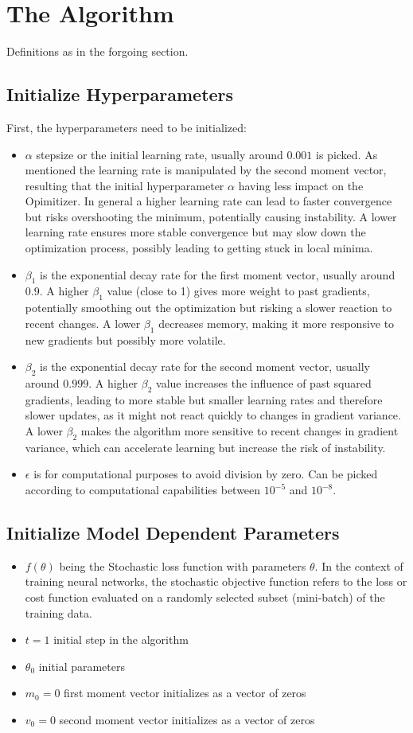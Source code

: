 \documentclass[journal]{IEEEtran}
\begin{document}
\section{The Algorithm}
Definitions as in the forgoing section.
\subsection{Initialize Hyperparameters}
First, the hyperparameters need to be initialized:
\begin{itemize}
    \item $\alpha$ stepsize or the initial learning rate, usually around $0.001$ is picked. As mentioned the learning rate is manipulated by the second moment vector, resulting that the initial hyperparameter $\alpha$ having less impact on the Opimitizer. In general a higher learning rate can lead to faster convergence but risks overshooting the minimum, potentially causing instability. A lower learning rate ensures more stable convergence but may slow down the optimization process, possibly leading to getting stuck in local minima. 
    \item $\beta_1$ is the exponential decay rate for the first moment vector, usually around $0.9$. A higher \(\beta_1\) value (close to 1) gives more weight to past gradients, potentially smoothing out the optimization but risking a slower reaction to recent changes. A lower \(\beta_1\) decreases memory, making it more responsive to new gradients but possibly more volatile.
    \item $\beta_2$ is the exponential decay rate for the second moment vector, usually around $0.999$. A higher \(\beta_2\) value increases the influence of past squared gradients, leading to more stable but smaller learning rates and therefore slower updates, as it might not react quickly to changes in gradient variance. A lower \(\beta_2\) makes the algorithm more sensitive to recent changes in gradient variance, which can accelerate learning but increase the risk of instability.
    \item $\epsilon$ is for computational purposes to avoid division by zero. Can be picked according to computational capabilities between $10^{-5}$ and $10^{-8}$.
\end{itemize}
\subsection{Initialize Model Dependent Parameters}
\begin{itemize}
    \item $f(\theta)$ being the Stochastic loss function with parameters $\theta$. In the context of training neural networks, the stochastic objective function refers to the loss or cost function evaluated on a randomly selected subset (mini-batch) of the training data.
    \item $t=1$ initial step in the algorithm
    \item $\theta_0$ initial parameters
    \item $m_0=0$ first moment vector initializes as a vector of zeros
    \item $v_0=0$ second moment vector initializes as a vector of zeros
\end{itemize}
\end{document}
